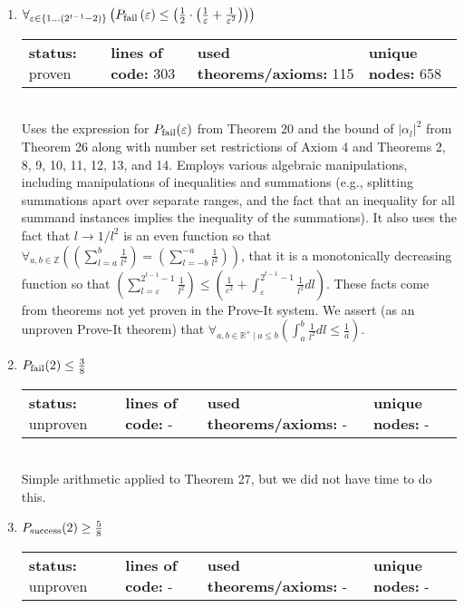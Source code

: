 \documentclass{article}[12pt]
\begin{document}
\begin{enumerate}
\item $\forall_{\varepsilon \in \{1\ldots \left(2^{t - 1} - 2\right)\}} \left(P_{\rm fail}\left(\varepsilon\right) \leq \left(\frac{1}{2} \cdot \left(\frac{1}{\varepsilon} + \frac{1}{\varepsilon^{2}}\right)\right)\right)$ \hfill \\
  \begin{tabular}{l | l | l | l}
    \textbf{status:} proven & \textbf{lines of code:} 303 & \textbf{used theorems/axioms:} 115 & \textbf{unique nodes:} 658
  \end{tabular} \hfill \\
  Uses the expression for $P_{\rm fail}(\varepsilon)$ from Theorem 20 and the bound of $\lvert \alpha_l \rvert^2$ from Theorem 26 along with number set restrictions of Axiom 4 and Theorems 2, 8, 9, 10, 11, 12, 13, and 14.  Employs various algebraic manipulations, including manipulations of inequalities and summations (e.g., splitting summations apart over separate ranges, and the fact that an inequality for all summand instances implies the inequality of the summations).  It also uses the fact that $l \rightarrow 1/l^2$ is an even function so that $\forall_{a, b \in \mathbb{Z}} \left(\left(\sum_{l=a}^{b} \frac{1}{l^{2}}\right) = \left(\sum_{l=-b}^{-a} \frac{1}{l^{2}}\right)\right)$, that it is a monotonically decreasing function so that $\left(\sum_{l=\varepsilon}^{2^{t - 1} - 1} \frac{1}{l^{2}}\right) \leq \left(\frac{1}{\varepsilon^{2}} + \int_{\varepsilon}^{2^{t - 1} - 1}\frac{1}{l^{2}}dl\right)$.  These facts come from theorems not yet proven in the Prove-It system.  We assert (as an unproven Prove-It theorem) that $\forall_{a, b \in \mathbb{R}^+~|~a \leq b} \left(\int_{a}^{b}\frac{1}{l^{2}}dl \leq \frac{1}{a}\right)$.
\item $P_{\rm fail}(2) \leq \frac{3}{8}$ \hfill \\
  \begin{tabular}{l | l | l | l}
    \textbf{status:} unproven & \textbf{lines of code:} - & \textbf{used theorems/axioms:} - & \textbf{unique nodes:} -            
  \end{tabular} \hfill \\
Simple arithmetic applied to Theorem 27, but we did not have time to do this.
\item $P_{\rm success}(2) \geq \frac{5}{8}$ \hfill \\
  \begin{tabular}{l | l | l | l}
    \textbf{status:} unproven & \textbf{lines of code:} - & \textbf{used theorems/axioms:} - & \textbf{unique nodes:} -            

\end{tabular}
\end{enumerate}
\end{document}

